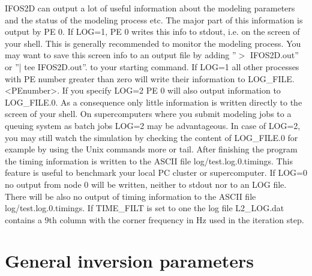 IFOS2D can output a lot of useful information about the modeling parameters and the status of the modeling process etc. The major part of this information is output by PE 0.
If LOG=1, PE 0 writes this info to stdout, i.e. on the screen of your shell. This is generally recommended to monitor the modeling process. You may want to save this screen info to an output file by adding ''$>$ IFOS2D.out'' or ''| tee IFOS2D.out''. to your starting command. If LOG=1 all other processes with PE number greater than zero will write their information to LOG\_FILE.<PEnumber>. If you specify LOG=2 PE 0 will also output information to LOG\_FILE.0. As a consequence only little information is written directly to the screen of your shell. On supercomputers where you submit modeling jobs to a queuing system as batch jobs LOG=2 may be advantageous. In case of LOG=2, you may still watch the simulation by checking the content of LOG\_FILE.0 for example by using the Unix commands more or tail. After finishing the program the timing information is written to the ASCII file log/test.log.0.timings. This feature is useful to benchmark your local PC cluster or supercomputer. If LOG=0 no output from node 0 will be written, neither to stdout nor to an LOG file. There will be also no output of timing information to the ASCII file log/test.log.0.timings.
If TIME\_FILT is set to one the log file L2\_LOG.dat contains a 9th column with the corner frequency in Hz used in the iteration step.

\newpage


\section{General inversion parameters}
{\color{blue}{\begin{verbatim}
"General inversion parameters" : "comment",
			"ITERMAX" : "10",
			"DATA_DIR" : "su/measured_data/IFOS2D_real",
			"PARAMETERIZATION" : "1",
			"FORWARD_ONLY" : "0",
			"ADJOINT_TYPE" : "1",
			"MISFIT_LOG_FILE" : "L2_LOG.dat",
			"VELOCITY" : "0",

"Inversion for ..." : "comment",
			"INV_RHO_ITER" : "0",
			"INV_VP_ITER" : "0",
			"INV_VS_ITER" : "0",
\end{verbatim}}}

{\color{red}{\begin{verbatim}
Default values are:
MISFIT_LOG_FILE=L2_LOG.dat
VELOCITY=0
INV_RHO_ITER=0
INV_VP_ITER=0
INV_VS_ITER=0
\end{verbatim}}}

